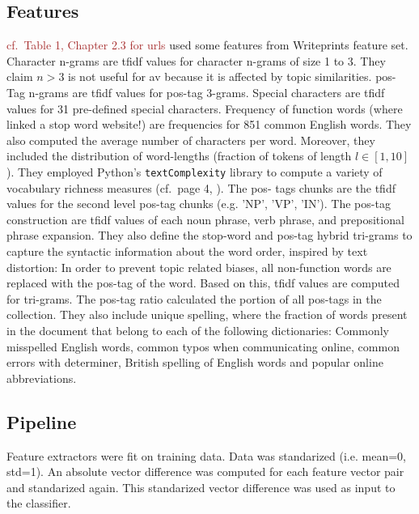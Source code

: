 \subsection{Features}
\textcolor{brown}{cf.~Table 1, \citep{weerasinghe_feature_vector_difference_2021} Chapter 2.3 for urls}
\citet{weerasinghe_feature_vector_difference_2021} used some features from Writeprints feature set.
Character n-grams are \ac{tfidf} values for character n-grams of size 1 to 3.
They claim $n>3$ is not useful for \ac{av} because it is affected by topic similarities.
\ac{pos}-Tag n-grams are \ac{tfidf} values for \ac{pos}-tag 3-grams.
Special characters are \ac{tfidf} values for 31 pre-defined special characters.
Frequency of function words (where \citep{weerasinghe_feature_vector_difference_2021} linked a stop word website!) 
are frequencies for 851 common English words.
They also computed the average number of characters per word. %
Moreover, they included the distribution of word-lengths (fraction of tokens of length $l \in [1,10]$).
They employed Python's \texttt{textComplexity} library to compute a variety of vocabulary richness measures 
(cf.~page 4, \citep{weerasinghe_feature_vector_difference_2021}).
The \ac{pos}- tags chunks are the \ac{tfidf} values for the second level \ac{pos}-tag chunks (e.g. 'NP', 'VP', 'IN').
The \ac{pos}-tag construction are \ac{tfidf} values of each noun phrase, verb phrase, and prepositional phrase expansion.
They also define the stop-word and \ac{pos}-tag hybrid tri-grams to capture the syntactic information about the word order, 
inspired by text distortion:
In order to prevent topic related biases, all non-function words are replaced with the \ac{pos}-tag of the word.
Based on this, \ac{tfidf} values are computed for tri-grams.
The \ac{pos}-tag ratio calculated the portion of all \ac{pos}-tags in the  collection.
They also include unique spelling, where the fraction of words present in the document that belong to each of the following dictionaries: 
Commonly misspelled English words, common typos when communicating online, common errors with determiner, 
British spelling of English words and popular online abbreviations.

\subsection{Pipeline}
Feature extractors were fit on training data.
Data was standarized (i.e. mean=0, std=1).
An absolute vector difference was computed for each feature vector pair and standarized again.
This standarized vector difference was used as input to the classifier.



